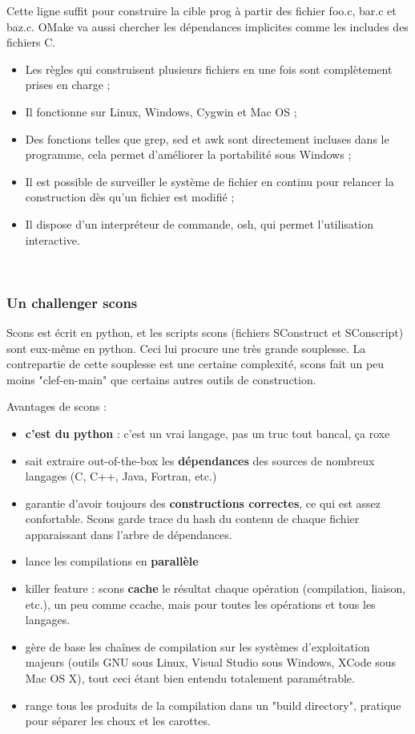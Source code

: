 \documentclass[11pt,twoside,a4paper]{article}
\begin{document}
Cette ligne suffit pour construire la cible prog {\`a} partir des fichier foo.c, bar.c et baz.c. OMake va aussi chercher les d{\'e}pendances implicites comme les includes des fichiers C.
\begin{itemize}
	\item Les r{\`e}gles qui construisent plusieurs fichiers en une fois sont compl{\`e}tement prises en charge ;
	\item Il fonctionne sur Linux, Windows, Cygwin et Mac OS ;
	\item Des fonctions telles que grep, sed et awk sont directement incluses dans le programme, cela permet d'am{\'e}liorer la portabilit{\'e} sous Windows ;
	\item Il est possible de surveiller le syst{\`e}me de fichier en continu pour relancer la construction d{\`e}s qu'un fichier est modifi{\'e} ;
	\item Il dispose d'un interpr{\'e}teur de commande, osh, qui permet l'utilisation interactive.
\end{itemize}~\\

\subsubsection{Un challenger scons}

Scons est {\'e}crit en python, et les scripts scons (fichiers SConstruct et SConscript) sont eux-m{\^e}me en python. Ceci lui procure une tr{\`e}s grande souplesse. La contrepartie de cette souplesse est une certaine complexit{\'e}, scons fait un peu moins "clef-en-main" que certains autres outils de construction.

Avantages de scons :
\begin{itemize}
	\item \textbf{c'est du python} : c'est un vrai langage, pas un truc tout bancal, \c{c}a roxe
	\item sait extraire out-of-the-box les \textbf{d{\'e}pendances} des sources de nombreux langages (C, C++, Java, Fortran, etc.)
	\item garantie d'avoir toujours des \textbf{constructions correctes}, ce qui est assez confortable. Scons garde trace du hash du contenu de chaque fichier apparaissant dans l'arbre de d{\'e}pendances.
	\item lance les compilations en \textbf{parall{\`e}le}
	\item killer feature : scons \textbf{cache} le r{\'e}sultat chaque op{\'e}ration (compilation, liaison, etc.), un peu comme ccache, mais pour toutes les op{\'e}rations et tous les langages.
	\item g{\`e}re de base les cha{\^i}nes de compilation sur les syst{\`e}mes d'exploitation majeurs (outils GNU sous Linux, Visual Studio sous Windows, XCode sous Mac OS X), tout ceci {\'e}tant bien entendu totalement param{\'e}trable.
	\item range tous les produits de la compilation dans un "build directory", pratique pour s{\'e}parer les choux et les carottes.
\end{itemize}~\\
\end{document}
